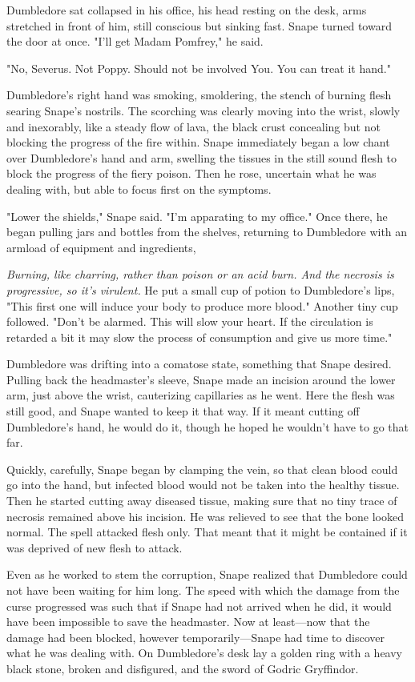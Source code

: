Dumbledore sat collapsed in his office, his head resting on the desk, arms stretched in front of him, still conscious but sinking fast. Snape turned toward the door at once. "I'll get Madam Pomfrey," he said.

"No, Severus. Not Poppy. Should not be involved{\el} You. You can treat it{\el} hand."

Dumbledore's right hand was smoking, smoldering, the stench of burning flesh searing Snape's nostrils. The scorching was clearly moving into the wrist, slowly and inexorably, like a steady flow of lava, the black crust concealing but not blocking the progress of the fire within. Snape immediately began a low chant over Dumbledore's hand and arm, swelling the tissues in the still sound flesh to block the progress of the fiery poison. Then he rose, uncertain what he was dealing with, but able to focus first on the symptoms.

"Lower the shields," Snape said. "I'm apparating to my office." Once there, he began pulling jars and bottles from the shelves, returning to Dumbledore with an armload of equipment and ingredients,

\emph{Burning, like charring, rather than poison or an acid burn. And the necrosis is progressive, so it's virulent.} He put a small cup of potion to Dumbledore's lips, "This first one will induce your body to produce more blood." Another tiny cup followed. "Don't be alarmed. This will slow your heart. If the circulation is retarded a bit it may slow the process of consumption and give us more time."

Dumbledore was drifting into a comatose state, something that Snape desired. Pulling back the headmaster's sleeve, Snape made an incision around the lower arm, just above the wrist, cauterizing capillaries as he went. Here the flesh was still good, and Snape wanted to keep it that way. If it meant cutting off Dumbledore's hand, he would do it, though he hoped he wouldn't have to go that far.

Quickly, carefully, Snape began by clamping the vein, so that clean blood could go into the hand, but infected blood would not be taken into the healthy tissue. Then he started cutting away diseased tissue, making sure that no tiny trace of necrosis remained above his incision. He was relieved to see that the bone looked normal. The spell attacked flesh only. That meant that it might be contained if it was deprived of new flesh to attack.

Even as he worked to stem the corruption, Snape realized that Dumbledore could not have been waiting for him long. The speed with which the damage from the curse progressed was such that if Snape had not arrived when he did, it would have been impossible to save the headmaster. Now at least—now that the damage had been blocked, however temporarily—Snape had time to discover what he was dealing with. On Dumbledore's desk lay a golden ring with a heavy black stone, broken and disfigured, and the sword of Godric Gryffindor.


